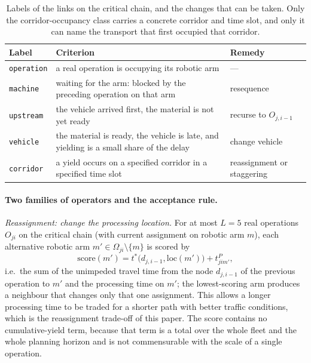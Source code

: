 \begin{table}[t]
  \caption{Labels of the links on the critical chain, and the changes that can be taken.
  Only the corridor-occupancy class carries a concrete corridor and time slot, and only it can name the transport that first occupied that corridor.}
\label{tab:attrib}
\footnotesize
\begin{tabular}{@{}llp{2.55cm}@{}}
\toprule
Label & Criterion & Remedy \\
\midrule
\texttt{operation} & a real operation is occupying its robotic arm & --- \\
\texttt{machine} & waiting for the arm: blocked by the preceding operation on that arm
  & resequence \\
\texttt{upstream} & the vehicle arrived first, the material is not yet ready & recurse to $O_{j,i-1}$ \\
\texttt{vehicle} & the material is ready, the vehicle is late, and yielding is a small share of the delay & change vehicle \\
\texttt{corridor} & a yield occurs on a specified corridor in a specified time slot & reassignment or staggering \\
\bottomrule
\end{tabular}
\end{table}

\paragraph{Two families of operators and the acceptance rule.}
\emph{Reassignment: change the processing location.} For at most $L=5$ real operations $O_{ji}$ on the critical chain (with current assignment on robotic arm $m$), each alternative robotic arm
$m'\in\Omega_{ji}\setminus\{m\}$ is scored by
\begin{equation}
\label{eq:reassign}
\mathrm{score}(m')=t^{*}\bigl(d_{j,i-1},\mathrm{loc}(m')\bigr)
+t^{P}_{jim'},
\end{equation}
i.e.\ the sum of the unimpeded travel time from the node $d_{j,i-1}$ of the previous operation to $m'$ and the processing time on $m'$; the lowest-scoring arm produces a neighbour that changes only that one assignment. This allows a longer processing time to be traded for a shorter path with better traffic conditions, which is the reassignment trade-off of this paper.
The score contains no cumulative-yield term, because that term is a total over the whole fleet and the whole planning horizon and is not commensurable with the scale of a single operation.

